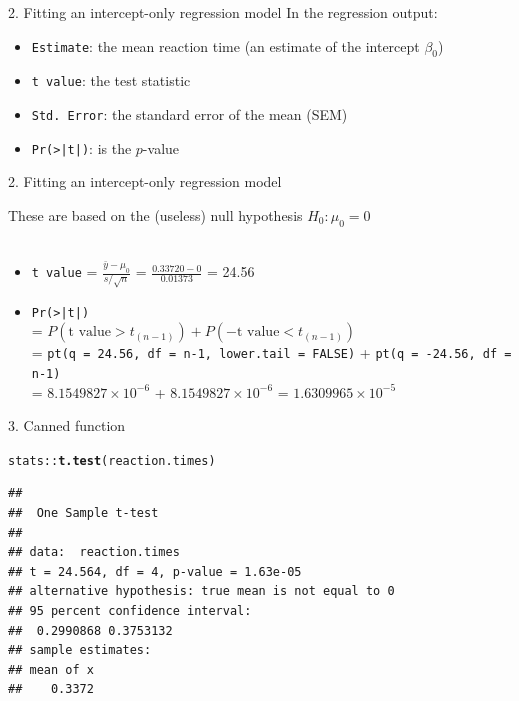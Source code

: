 \documentclass{beamer}\usepackage[]{graphicx}\usepackage[]{color}
\newcommand{\hlopt}[1]{\textcolor[rgb]{0,0,0}{#1}}%
\newcommand{\hlstd}[1]{\textcolor[rgb]{0.345,0.345,0.345}{#1}}%
\newcommand{\hlkwd}[1]{\textcolor[rgb]{0.737,0.353,0.396}{\textbf{#1}}}%
\newenvironment{knitrout}{}{} %
\begin{document}
\begin{frame}[fragile]{2. Fitting an intercept-only regression model}
In the regression output:
\begin{itemize}
	\setlength\itemsep{1em}
	\item \texttt{Estimate}: the mean reaction time (an estimate of the intercept $\beta_0$)
	\item \texttt{t value}: the test statistic 
	\item \texttt{Std. Error}: the standard error of the mean (SEM)
	\item \texttt{Pr(>|t|)}: is the $p$-value
\end{itemize} 


\end{frame}


\begin{frame}[fragile]{2. Fitting an intercept-only regression model}



\small
These are based on the (useless) null hypothesis $H_0: \mu_0 = 0$ \\ \ \\

\begin{itemize}
	\item \texttt{t value} = $\frac{\bar{y} - \mu_0}{s / \sqrt{n}}$ = $\frac{0.33720 - 0}{0.01373}$ = 24.56
	\item \texttt{Pr(>|t|)} \\
	= $P(\textrm{t value} > t_{(n-1)}) + P(-\textrm{t value} < t_{(n-1)})$ \\
	 = \small{\texttt{pt(q = 24.56, df = n-1, lower.tail = FALSE)} + \texttt{pt(q = -24.56, df = n-1)}} \\
	  = \ensuremath{8.1549827\times 10^{-6}} + \ensuremath{8.1549827\times 10^{-6}} = \ensuremath{1.6309965\times 10^{-5}}
\end{itemize}


\end{frame}



\begin{frame}[fragile]{3. Canned function}

\begin{knitrout}\scriptsize
{}\color{fgcolor}
\begin{alltt}
\hlstd{stats}\hlopt{::}\hlkwd{t.test}\hlstd{(reaction.times)}
\end{alltt}
\begin{verbatim}
## 
## 	One Sample t-test
## 
## data:  reaction.times
## t = 24.564, df = 4, p-value = 1.63e-05
## alternative hypothesis: true mean is not equal to 0
## 95 percent confidence interval:
##  0.2990868 0.3753132
## sample estimates:
## mean of x 
##    0.3372
\end{verbatim}

\end{knitrout}

\end{frame}
\end{document}
